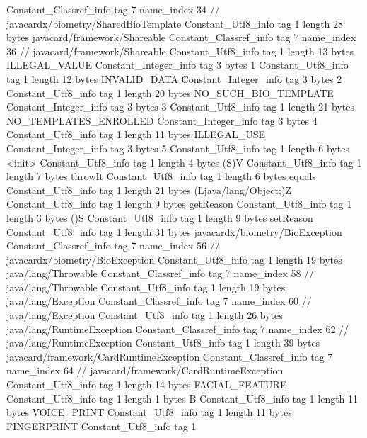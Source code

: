 {{{		}
		Constant_Classref_info {
			tag	7
			name_index	34		// javacardx/biometry/SharedBioTemplate
		}
		Constant_Utf8_info {
			tag	1
			length	28
			bytes	javacard/framework/Shareable
		}
		Constant_Classref_info {
			tag	7
			name_index	36		// javacard/framework/Shareable
		}
		Constant_Utf8_info {
			tag	1
			length	13
			bytes	ILLEGAL_VALUE
		}
		Constant_Integer_info {
			tag	3
			bytes	1
		}
		Constant_Utf8_info {
			tag	1
			length	12
			bytes	INVALID_DATA
		}
		Constant_Integer_info {
			tag	3
			bytes	2
		}
		Constant_Utf8_info {
			tag	1
			length	20
			bytes	NO_SUCH_BIO_TEMPLATE
		}
		Constant_Integer_info {
			tag	3
			bytes	3
		}
		Constant_Utf8_info {
			tag	1
			length	21
			bytes	NO_TEMPLATES_ENROLLED
		}
		Constant_Integer_info {
			tag	3
			bytes	4
		}
		Constant_Utf8_info {
			tag	1
			length	11
			bytes	ILLEGAL_USE
		}
		Constant_Integer_info {
			tag	3
			bytes	5
		}
		Constant_Utf8_info {
			tag	1
			length	6
			bytes	<init>
		}
		Constant_Utf8_info {
			tag	1
			length	4
			bytes	(S)V
		}
		Constant_Utf8_info {
			tag	1
			length	7
			bytes	throwIt
		}
		Constant_Utf8_info {
			tag	1
			length	6
			bytes	equals
		}
		Constant_Utf8_info {
			tag	1
			length	21
			bytes	(Ljava/lang/Object;)Z
		}
		Constant_Utf8_info {
			tag	1
			length	9
			bytes	getReason
		}
		Constant_Utf8_info {
			tag	1
			length	3
			bytes	()S
		}
		Constant_Utf8_info {
			tag	1
			length	9
			bytes	setReason
		}
		Constant_Utf8_info {
			tag	1
			length	31
			bytes	javacardx/biometry/BioException
		}
		Constant_Classref_info {
			tag	7
			name_index	56		// javacardx/biometry/BioException
		}
		Constant_Utf8_info {
			tag	1
			length	19
			bytes	java/lang/Throwable
		}
		Constant_Classref_info {
			tag	7
			name_index	58		// java/lang/Throwable
		}
		Constant_Utf8_info {
			tag	1
			length	19
			bytes	java/lang/Exception
		}
		Constant_Classref_info {
			tag	7
			name_index	60		// java/lang/Exception
		}
		Constant_Utf8_info {
			tag	1
			length	26
			bytes	java/lang/RuntimeException
		}
		Constant_Classref_info {
			tag	7
			name_index	62		// java/lang/RuntimeException
		}
		Constant_Utf8_info {
			tag	1
			length	39
			bytes	javacard/framework/CardRuntimeException
		}
		Constant_Classref_info {
			tag	7
			name_index	64		// javacard/framework/CardRuntimeException
		}
		Constant_Utf8_info {
			tag	1
			length	14
			bytes	FACIAL_FEATURE
		}
		Constant_Utf8_info {
			tag	1
			length	1
			bytes	B
		}
		Constant_Utf8_info {
			tag	1
			length	11
			bytes	VOICE_PRINT
		}
		Constant_Utf8_info {
			tag	1
			length	11
			bytes	FINGERPRINT
		}
		Constant_Utf8_info {
			tag	1
}}}

